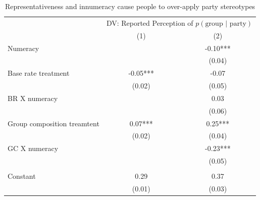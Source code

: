 \documentclass[12pt, letterpaper]{article}
\begin{document}
\begin{table}[]
\caption{Representativeness and innumeracy cause people to over-apply party stereotypes}
\label{tab:representativeness}
\begin{center}
\begin{tabular}{l|cc|}
\cline{2-3}
                                                  & \multicolumn{2}{c|}{DV: Reported Perception of $p(\text{group | party})$} \\ \cline{2-3} 
                                                  & (1)                             & (2)                             \\ \hline
\multicolumn{1}{|l|}{Numeracy}                    &                                 & -0.10***                        \\
\multicolumn{1}{|l|}{}                            &                                 & (0.04)                          \\
\multicolumn{1}{|l|}{Base rate treatment}         & -0.05***                        & -0.07                           \\
\multicolumn{1}{|l|}{}                            & (0.02)                          & (0.05)                          \\
\multicolumn{1}{|l|}{BR X numeracy}               &                                 & 0.03                            \\
\multicolumn{1}{|l|}{}                            &                                 & (0.06)                          \\
\multicolumn{1}{|l|}{Group composition treamtent} & 0.07***                         & 0.25***                         \\
\multicolumn{1}{|l|}{}                            & (0.02)                          & (0.04)                          \\
\multicolumn{1}{|l|}{GC X numeracy}               &                                 & -0.23***                        \\
\multicolumn{1}{|l|}{}                            &                                 & (0.05)                          \\
\multicolumn{1}{|l|}{}                            &                                 &                                 \\
\multicolumn{1}{|l|}{Constant}                    & 0.29                            & 0.37                            \\
\multicolumn{1}{|l|}{}                            & (0.01)                          & (0.03)                          \\

\end{tabular}
\end{center}
\end{table}
\end{document}
